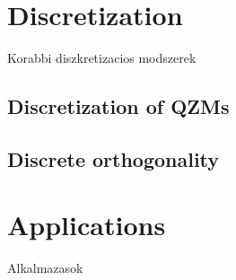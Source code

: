 \section{Discretization}
Korabbi diszkretizacios modszerek
\subsection{Discretization of QZMs}
\subsection{Discrete orthogonality}


\section{Applications}
Alkalmazasok






